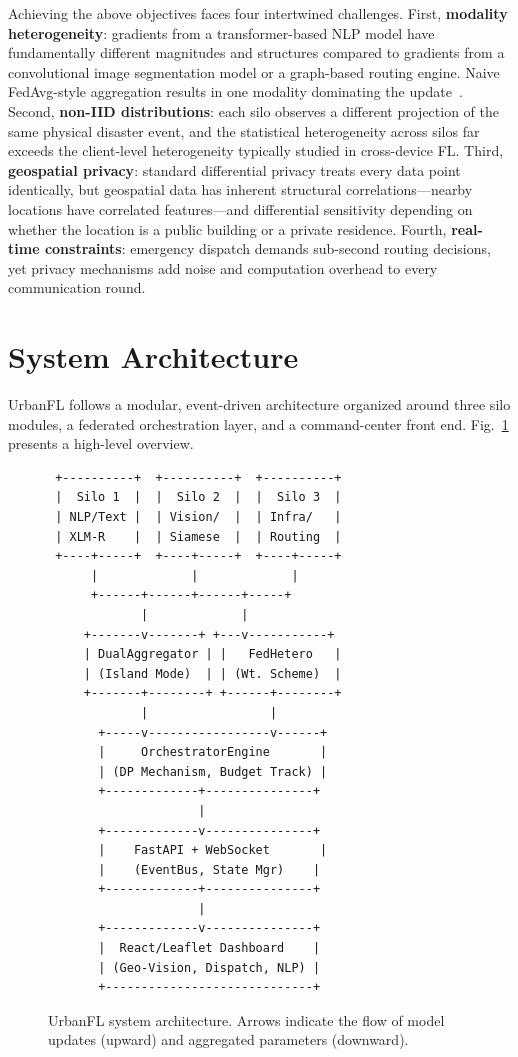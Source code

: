 \documentclass[conference]{IEEEtran}
\begin{document}
Achieving the above objectives faces four intertwined challenges. First, \textbf{modality heterogeneity}: gradients from a transformer-based NLP model have fundamentally different magnitudes and structures compared to gradients from a convolutional image segmentation model or a graph-based routing engine. Naive FedAvg-style aggregation results in one modality dominating the update~\cite{b4}. Second, \textbf{non-IID distributions}: each silo observes a different projection of the same physical disaster event, and the statistical heterogeneity across silos far exceeds the client-level heterogeneity typically studied in cross-device FL. Third, \textbf{geospatial privacy}: standard differential privacy treats every data point identically, but geospatial data has inherent structural correlations---nearby locations have correlated features---and differential sensitivity depending on whether the location is a public building or a private residence. Fourth, \textbf{real-time constraints}: emergency dispatch demands sub-second routing decisions, yet privacy mechanisms add noise and computation overhead to every communication round.

\section{System Architecture}

UrbanFL follows a modular, event-driven architecture organized around three silo modules, a federated orchestration layer, and a command-center front end. Fig.~\ref{fig:arch} presents a high-level overview.

\begin{figure}[htbp]
\centering
\small
\begin{verbatim}
 +----------+  +----------+  +----------+
 |  Silo 1  |  |  Silo 2  |  |  Silo 3  |
 | NLP/Text |  | Vision/  |  | Infra/   |
 | XLM-R    |  | Siamese  |  | Routing  |
 +----+-----+  +----+-----+  +----+-----+
      |             |             |
      +------+------+------+-----+
             |             |
     +-------v-------+ +---v-----------+
     | DualAggregator | |   FedHetero   |
     | (Island Mode)  | | (Wt. Scheme)  |
     +-------+--------+ +------+--------+
             |                 |
       +-----v-----------------v------+
       |     OrchestratorEngine       |
       | (DP Mechanism, Budget Track) |
       +-------------+---------------+
                     |
       +-------------v---------------+
       |    FastAPI + WebSocket       |
       |    (EventBus, State Mgr)    |
       +-------------+---------------+
                     |
       +-------------v---------------+
       |  React/Leaflet Dashboard    |
       | (Geo-Vision, Dispatch, NLP) |
       +-----------------------------+
\end{verbatim}
\caption{UrbanFL system architecture. Arrows indicate the flow of model updates (upward) and aggregated parameters (downward).}
\label{fig:arch}
\end{figure}
\end{document}
